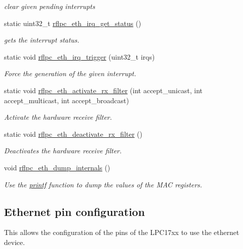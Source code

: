 \begin{DoxyCompactItemize}
\begin{DoxyCompactList}\small\item\em clear given pending interrupts \end{DoxyCompactList}\item 
static uint32\-\_\-t \hyperlink{group__eth_gaa8edd8188bb816ca8a3d5a4c432b1f2c}{rflpc\-\_\-eth\-\_\-irq\-\_\-get\-\_\-status} ()
\begin{DoxyCompactList}\small\item\em gets the interrupt status. \end{DoxyCompactList}\item 
static void \hyperlink{group__eth_ga9b1dae38f883c57f355d4e861d189df8}{rflpc\-\_\-eth\-\_\-irq\-\_\-trigger} (uint32\-\_\-t irqs)
\begin{DoxyCompactList}\small\item\em Force the generation of the given interrupt. \end{DoxyCompactList}\item 
static void \hyperlink{group__eth_ga94e7bd8f0461a5cdcd591ab65d547c32}{rflpc\-\_\-eth\-\_\-activate\-\_\-rx\-\_\-filter} (int accept\-\_\-unicast, int accept\-\_\-multicast, int accept\-\_\-broadcast)
\begin{DoxyCompactList}\small\item\em Activate the hardware receive filter. \end{DoxyCompactList}\item 
static void \hyperlink{group__eth_ga242f3993144325b34fb8f257f9148dff}{rflpc\-\_\-eth\-\_\-deactivate\-\_\-rx\-\_\-filter} ()
\begin{DoxyCompactList}\small\item\em Deactivates the hardware receive filter. \end{DoxyCompactList}\item 
void \hyperlink{group__eth_ga0eb1c1d02e6f05055972a7309b22e123}{rflpc\-\_\-eth\-\_\-dump\-\_\-internals} ()
\begin{DoxyCompactList}\small\item\em Use the \hyperlink{group__libc_ga98631211a4a8aee62f572375d5b637be}{printf} function to dump the values of the M\-A\-C registers. \end{DoxyCompactList}\end{DoxyCompactItemize}
\subsection*{Ethernet pin configuration}
\label{_amgrp8074f4510162ac5a95592b7cd751de67}%
This allows the configuration of the pins of the L\-P\-C17xx to use the ethernet device.

